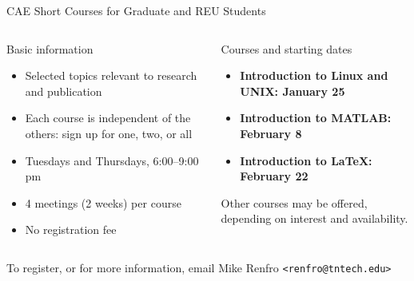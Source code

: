\documentclass{beamer}
\begin{document}
\begin{frame}[fragile]{CAE Short Courses for Graduate and REU Students}
\begin{columns}[t]
\begin{column}{0.5\textwidth}
Basic information
\begin{itemize}
\item Selected topics relevant to research and publication
\item Each course is independent of the others: sign up for one, two, or all
\item Tuesdays and Thursdays, 6:00--9:00 pm
\item 4 meetings (2 weeks) per course
\item No registration fee
\end{itemize}
\end{column}
\begin{column}{0.5\textwidth}
Courses and starting dates
\begin{itemize}
\item \bfseries{Introduction to Linux and UNIX: January 25}
\item \bfseries{Introduction to MATLAB: February 8}
\item \bfseries{Introduction to \LaTeX{}: February 22}
\end{itemize}
Other courses may be offered, depending on interest and availability.
\end{column}
\end{columns}
\begin{center}
To register, or for more information, email Mike Renfro \verb|<renfro@tntech.edu>|
\end{center}
\end{frame}
\end{document}
